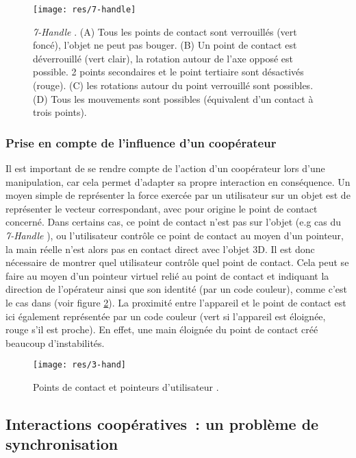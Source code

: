 \documentclass[11pt]{article}
\begin{document}
\begin{figure}
\centering
\texttt{[image: res/7-handle]}
\caption{\label{fig:7-handler}\textit{7-Handle} \cite{thesis}. (A) Tous les points de contact sont verrouillés (vert foncé), l'objet ne peut pas bouger. (B) Un point de contact est déverrouillé (vert clair), la rotation autour de l'axe opposé est possible. 2 points secondaires et le point tertiaire sont désactivés (rouge). (C) les rotations autour du point verrouillé sont possibles. (D) Tous les mouvements sont possibles (équivalent d'un contact à trois points).}
\end{figure}

\subsubsection{Prise en compte de l'influence d'un coopérateur}
Il est important de se rendre compte de l'action d'un coopérateur lors d'une manipulation, car cela permet d'adapter sa propre interaction en conséquence. Un moyen simple de représenter la force exercée par un utilisateur sur un objet est de représenter le vecteur correspondant, avec pour origine le point de contact concerné. Dans certains cas, ce point de contact n'est pas sur l'objet (e.g cas du \textit{7-Handle} \cite{thesis}), ou l'utilisateur contr\^ole ce point de contact au moyen d'un pointeur, la main réelle n'est alors pas en contact direct avec l'objet 3D. Il est donc nécessaire de montrer quel utilisateur contr\^ole quel point de contact. Cela peut se faire au moyen d'un pointeur virtuel relié au point de contact et indiquant la direction de l'opérateur ainsi que son identité (par un code couleur), comme c'est le cas dans \cite{3-hand} (voir figure \ref{fig:3-hand}). La proximité entre l'appareil et le point de contact est ici également représentée par un code couleur (vert si l'appareil est éloignée, rouge s'il est proche). En effet, une main éloignée du point de contact créé beaucoup d'instabilités. 

\begin{figure}
\centering
\texttt{[image: res/3-hand]}
\caption{\label{fig:3-hand}Points de contact et pointeurs d'utilisateur \cite{3-hand}.}
\end{figure}

\subsection{Interactions coopératives~: un problème de synchronisation}
\end{document}
